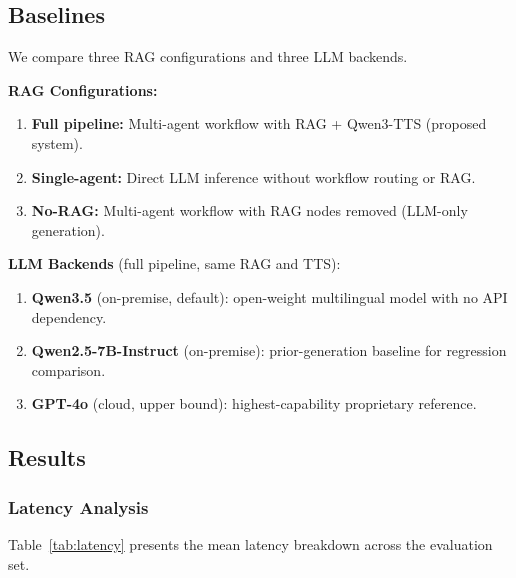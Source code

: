 \documentclass[10pt, a4paper, twocolumn]{article}
\begin{document}
\subsection{Baselines}

We compare three RAG configurations and three LLM backends.

\noindent\textbf{RAG Configurations:}
\begin{enumerate}[label=(\alph*), nosep]
    \item \textbf{Full pipeline:} Multi-agent workflow with RAG + Qwen3-TTS (proposed system).
    \item \textbf{Single-agent:} Direct LLM inference without workflow routing or RAG.
    \item \textbf{No-RAG:} Multi-agent workflow with RAG nodes removed (LLM-only generation).
\end{enumerate}

\noindent\textbf{LLM Backends} (full pipeline, same RAG and TTS):
\begin{enumerate}[label=(\roman*), nosep]
    \item \textbf{Qwen3.5} (on-premise, default): open-weight multilingual model with no API dependency.
    \item \textbf{Qwen2.5-7B-Instruct} (on-premise): prior-generation baseline for regression comparison.
    \item \textbf{GPT-4o} (cloud, upper bound): highest-capability proprietary reference.
\end{enumerate}

\subsection{Results}

\subsubsection{Latency Analysis}

Table~\ref{tab:latency} presents the mean latency breakdown across the evaluation set.

\begin{table}[t]
    \centering
    \caption{Mean latency breakdown (seconds) across 50 evaluation queries. $t_\text{ret}$ and $t_\text{LLM}$ are sub-components of orchestration; $t_\text{TTS}$ is measured to first sentence playback.}
    \label{tab:latency}
    \small
\end{table}
\end{document}
